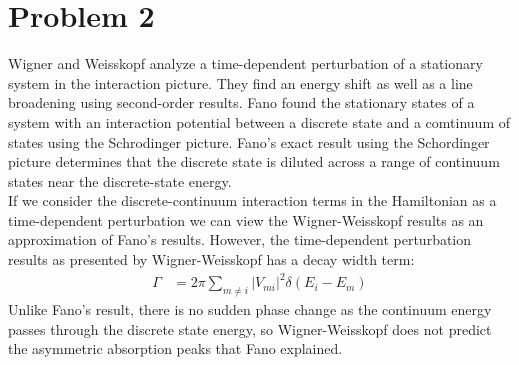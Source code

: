 \documentclass[a4paper,11pt]{article}
\numberwithin{equation}{section}
\begin{document}
\section{Problem 2}
Wigner and Weisskopf analyze a time-dependent perturbation of a stationary system in the interaction picture. 
They find an energy shift as well as a line broadening using second-order results.
Fano found the stationary states of a system with an interaction potential between a discrete state and a comtinuum of states using the Schrodinger picture. 
Fano's exact result using the Schordinger picture determines that the discrete state is diluted across a range of continuum states near the discrete-state energy.\\
If we consider the discrete-continuum interaction terms in the Hamiltonian as a time-dependent perturbation we can view the Wigner-Weisskopf results as an approximation of Fano's results.
However, the time-dependent perturbation results as presented by Wigner-Weisskopf has a decay width term:
\begin{align}
 \Gamma &= 2\pi\sum_{m \ne i}|V_{mi}|^2\delta(E_i-E_m)
\end{align}
Unlike Fano's result, there is no sudden phase change as the continuum energy passes through the discrete state energy, so Wigner-Weisskopf does not predict the asymmetric absorption peaks that Fano explained.
\end{document}
